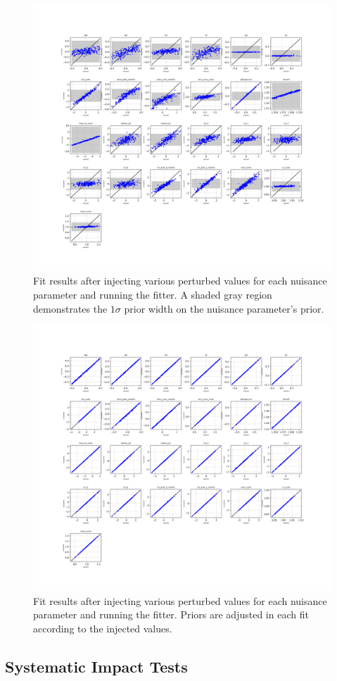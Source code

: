 \documentclass[main.tex]{subfiles}
\begin{document}
\begin{figure}
    \centering 
    \includegraphics[width=0.7\linewidth]{figures/syst_ir_shuffle_nofix.png}
    \caption{Fit results after injecting various perturbed values for each nuisance parameter and running the fitter. A shaded gray region demonstrates the $1\sigma$ prior width on the nuisance parameter's prior.}\label{fig:ir_nopriorpert}
\end{figure}


\begin{figure}
    \centering 
    \includegraphics[width=0.7\linewidth]{figures/update_inject_recover_syst_prior.png}
    \caption{Fit results after injecting various perturbed values for each nuisance parameter and running the fitter. Priors are adjusted in each fit according to the injected values.}\label{fig:ir_priorpert}
\end{figure}

\subsection{Systematic Impact Tests}
\end{document}
